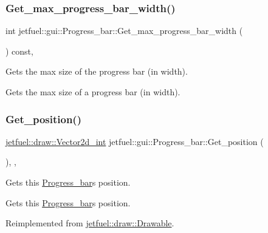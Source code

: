 \subsubsection{\texorpdfstring{Get\+\_\+max\+\_\+progress\+\_\+bar\+\_\+width()}{Get\_max\_progress\_bar\_width()}}
{\footnotesize\ttfamily int jetfuel\+::gui\+::\+Progress\+\_\+bar\+::\+Get\+\_\+max\+\_\+progress\+\_\+bar\+\_\+width (\begin{DoxyParamCaption}{ }\end{DoxyParamCaption}) const\hspace{0.3cm}{\ttfamily [inline]}, {\ttfamily [protected]}}



Gets the max size of the progress bar (in width). 

Gets the max size of a progress bar (in width). \mbox{\label{classjetfuel_1_1gui_1_1Progress__bar_a5771ea71b321c173383e89537cea0ae1}} 
\subsubsection{\texorpdfstring{Get\+\_\+position()}{Get\_position()}}
{\footnotesize\ttfamily \hyperlink{classjetfuel_1_1draw_1_1Vector2d}{jetfuel\+::draw\+::\+Vector2d\+\_\+int} jetfuel\+::gui\+::\+Progress\+\_\+bar\+::\+Get\+\_\+position (\begin{DoxyParamCaption}{ }\end{DoxyParamCaption})\hspace{0.3cm}{\ttfamily [inline]}, {\ttfamily [override]}, {\ttfamily [virtual]}}



Gets this \hyperlink{classjetfuel_1_1gui_1_1Progress__bar}{Progress\+\_\+bar}\textquotesingle{}s position. 

Gets this \hyperlink{classjetfuel_1_1gui_1_1Progress__bar}{Progress\+\_\+bar}\textquotesingle{}s position. 

Reimplemented from \hyperlink{classjetfuel_1_1draw_1_1Drawable_ae7ebd30d66db2c8a5d5371cbcf0023fc}{jetfuel\+::draw\+::\+Drawable}.

\mbox{\label{classjetfuel_1_1gui_1_1Progress__bar_ae1fc30f6eacefc0fcca909d7d3f52225}} 
